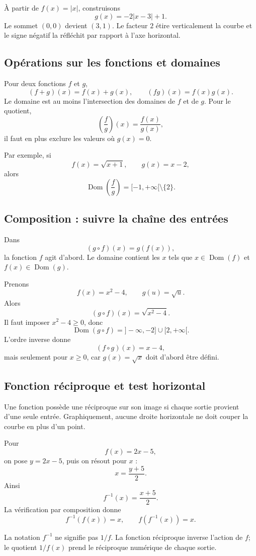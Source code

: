 \documentclass[12pt,a4paper,openany]{book}
\newcommand{\abs}[1]{\left\lvert #1\right\rvert}
\newcommand{\dom}{\operatorname{Dom}}
\begin{document}
\begin{examplebox}
À partir de $f(x)=\abs x$, construisons
\[
g(x)=-2\abs{x-3}+1.
\]
Le sommet $(0,0)$ devient $(3,1)$. Le facteur $2$ étire verticalement la courbe et le signe négatif la réfléchit par rapport à l'axe horizontal.
\end{examplebox}

\subsection{Opérations sur les fonctions et domaines}

Pour deux fonctions $f$ et $g$,
\[
(f+g)(x)=f(x)+g(x),
\qquad
(fg)(x)=f(x)g(x).
\]
Le domaine est au moins l'intersection des domaines de $f$ et de $g$. Pour le quotient,
\[
\left(\frac fg\right)(x)=\frac{f(x)}{g(x)},
\]
il faut en plus exclure les valeurs où $g(x)=0$.

Par exemple, si
\[
f(x)=\sqrt{x+1},
\qquad
g(x)=x-2,
\]
alors
\[
\dom\left(\frac fg\right)=[-1,+\infty[\setminus\{2\}.
\]

\subsection{Composition : suivre la chaîne des entrées}

Dans
\[
(g\circ f)(x)=g(f(x)),
\]
la fonction $f$ agit d'abord. Le domaine contient les $x$ tels que $x\in\dom(f)$ et $f(x)\in\dom(g)$.

Prenons
\[
f(x)=x^2-4,
\qquad g(u)=\sqrt u.
\]
Alors
\[
(g\circ f)(x)=\sqrt{x^2-4}.
\]
Il faut imposer $x^2-4\geq0$, donc
\[
\dom(g\circ f)=]-\infty,-2]\cup[2,+\infty[.
\]
L'ordre inverse donne
\[
(f\circ g)(x)=x-4,
\]
mais seulement pour $x\geq0$, car $g(x)=\sqrt x$ doit d'abord être défini.

\subsection{Fonction réciproque et test horizontal}

Une fonction possède une réciproque sur son image si chaque sortie provient d'une seule entrée. Graphiquement, aucune droite horizontale ne doit couper la courbe en plus d'un point.

Pour
\[
f(x)=2x-5,
\]
on pose $y=2x-5$, puis on résout pour $x$ :
\[
x=\frac{y+5}{2}.
\]
Ainsi
\[
f^{-1}(x)=\frac{x+5}{2}.
\]
La vérification par composition donne
\[
f^{-1}(f(x))=x,
\qquad
f(f^{-1}(x))=x.
\]

\begin{warningbox}
La notation $f^{-1}$ ne signifie pas $1/f$. La fonction réciproque inverse l'action de $f$; le quotient $1/f(x)$ prend le réciproque numérique de chaque sortie.
\end{warningbox}
\end{document}
